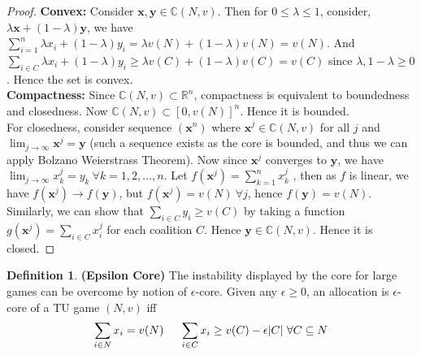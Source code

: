 \documentclass{article}
\theoremstyle{definition}
\newtheorem{defn}{Definition}[section]
\begin{document}
\begin{proof}
\textbf{Convex:} Consider $\mathbf{x,y} \in \mathbb{C}(N,v)$. Then for $0\leq \lambda \leq 1$, consider, $\lambda \mathbf{x} + (1-\lambda)\mathbf{y}$, we have $ \sum_{i=1}^n \lambda x_i + (1-\lambda)y_i = \lambda v(N) + (1-\lambda)v(N) = v(N)$. And $ \sum_{i\in C} \lambda x_i + (1-\lambda)y_i \geq \lambda v(C) + (1-\lambda)v(C) = v(C)$ since $\lambda, 1-\lambda \geq 0$. Hence the set is convex.\\
\textbf{Compactness:} Since $\mathbb{C}(N,v) \subset \mathbb{R}^n$, compactness is equivalent to boundedness and closedness. Now $\mathbb{C}(N,v) \subset [0,v(N)]^{n}$. Hence it is bounded.\\
For closedness, consider sequence $(\mathbf{x}^n)$ where $\mathbf{x}^j \in \mathbb{C}(N,v)$ for all $j$ and $\lim_{j \to \infty} \mathbf{x}^j = \mathbf{y}$ (such a sequence exists as the core is bounded, and thus we can apply Bolzano Weierstrass Theorem). Now since $\mathbf{x}^j$ converges to $\mathbf{y}$, we have $\lim_{j \to \infty} x_k^j = y_k~\forall k = 1,2,\dots,n$. Let $f(\mathbf{x}^j)=\sum_{k=1}^n x^j_k$ , then as $f$ is linear, we have $f(\mathbf{x}^j) \to f(\mathbf{y})$, but $f(\mathbf{x}^j) = v(N)~\forall j$, hence $f(\mathbf{y}) = v(N)$. Similarly, we can show that $\sum_{i \in C} y_i \geq v(C)$ by taking a function $g(\mathbf{x}^j) = \sum_{i \in C} x_i^j$ for each coalition $C$. Hence $\mathbf{y} \in \mathbb{C}(N,v)$. Hence it is closed.
\end{proof}
\begin{defn}
\textbf{(Epsilon Core)} The instability displayed by the core for large games can be overcome by notion of $\epsilon$-core. Given any $\epsilon \geq 0$, an allocation is $\epsilon$-core of a TU game $(N,v)$ iff $$\sum_{i \in N} x_i = v(N) \hspace{5mm} \sum_{i \in C} x_i \geq v(C) - \epsilon |C| ~\forall C \subseteq N$$
\end{defn}
\end{document}
